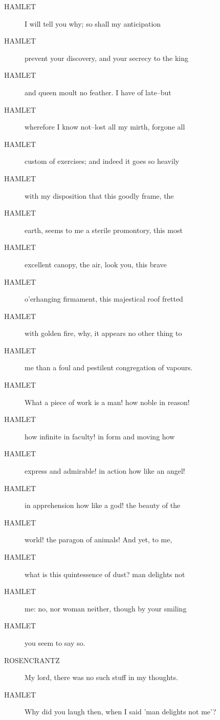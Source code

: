\documentclass{article}
\begin{document}
\begin{description}
            
\item[HAMLET] I will tell you why; so shall my anticipation
\item[HAMLET] prevent your discovery, and your secrecy to the king
\item[HAMLET] and queen moult no feather. I have of late--but
\item[HAMLET] wherefore I know not--lost all my mirth, forgone all
\item[HAMLET] custom of exercises; and indeed it goes so heavily
\item[HAMLET] with my disposition that this goodly frame, the
\item[HAMLET] earth, seems to me a sterile promontory, this most
\item[HAMLET] excellent canopy, the air, look you, this brave
\item[HAMLET] o'erhanging firmament, this majestical roof fretted
\item[HAMLET] with golden fire, why, it appears no other thing to
\item[HAMLET] me than a foul and pestilent congregation of vapours.
\item[HAMLET] What a piece of work is a man! how noble in reason!
\item[HAMLET] how infinite in faculty! in form and moving how
\item[HAMLET] express and admirable! in action how like an angel!
\item[HAMLET] in apprehension how like a god! the beauty of the
\item[HAMLET] world! the paragon of animals! And yet, to me,
\item[HAMLET] what is this quintessence of dust? man delights not
\item[HAMLET] me: no, nor woman neither, though by your smiling
\item[HAMLET] you seem to say so.
\end{description}
          
\begin{description}
            
\item[ROSENCRANTZ] My lord, there was no such stuff in my thoughts.
\end{description}
          
\begin{description}
            
\item[HAMLET] Why did you laugh then, when I said 'man delights not me'?
\end{description}
          
\end{document}

